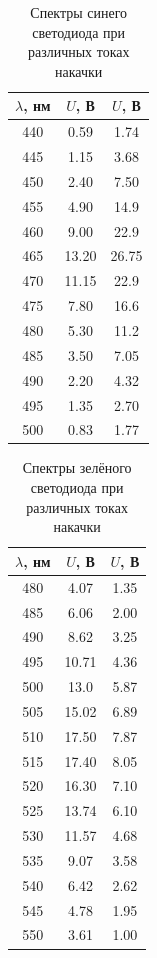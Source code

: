 \documentclass[a4paper, 12pt]{extarticle}
\begin{document}
\begin{table}[h]
    \centering
    
    \begin{tabular}{|c|c|c|}
        \hline
        $\lambda$, нм & $U$, В & $U$, В \\
        \hline
        440 & 0.59 & 1.74 \\
        445 & 1.15 & 3.68 \\
        450 & 2.40 & 7.50 \\
        455 & 4.90 & 14.9 \\
        460 & 9.00 & 22.9 \\
        465 & 13.20 & 26.75 \\
        470 & 11.15 & 22.9 \\
        475 & 7.80 & 16.6 \\
        480 & 5.30 & 11.2 \\
        485 & 3.50 & 7.05 \\
        490 & 2.20 & 4.32 \\
        495 & 1.35 & 2.70 \\
        500 & 0.83 & 1.77 \\
        \hline
    \end{tabular}
    \caption{Спектры синего светодиода при различных токах накачки}
\end{table}

\begin{table}[h]
    \centering
    
    \begin{tabular}{|c|c|c|}
        \hline
        $\lambda$, нм & $U$, В & $U$, В \\
        \hline
        480 & 4.07 & 1.35 \\
        485 & 6.06 & 2.00 \\
        490 & 8.62 & 3.25 \\
        495 & 10.71 & 4.36 \\
        500 & 13.0 & 5.87 \\
        505 & 15.02 & 6.89 \\
        510 & 17.50 & 7.87 \\
        515 & 17.40 & 8.05 \\
        520 & 16.30 & 7.10 \\
        525 & 13.74 & 6.10 \\
        530 & 11.57 & 4.68 \\
        535 & 9.07 & 3.58 \\
        540 & 6.42 & 2.62 \\
        545 & 4.78 & 1.95 \\
        550 & 3.61 & 1.00 \\
        \hline
    \end{tabular}
    \caption{Спектры зелёного светодиода при различных токах накачки}
\end{table}
\end{document}
